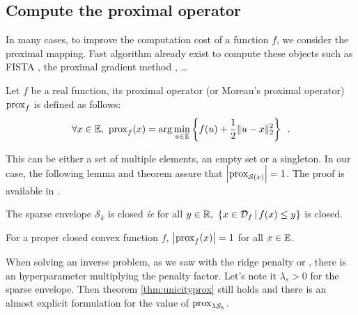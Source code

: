 
\subsection{Compute the proximal operator}

In many cases, to improve the computation cost of a function $f$, we consider the proximal mapping. Fast algorithm already exist to compute these objects such as FISTA \cite{beck2009fast}, the proximal gradient method \cite{ryu2017proximal}, \dots

\begin{definition}\label{def:prox}
Let $f$ be a real function, its proximal operator (or Moreau's proximal operator) $\operatorname{prox}_f$ is defined as follows:
\[\forall x\in\mathbb{E},\ \operatorname{prox}_f(x) =\arg\min_{u\in \mathbb{E}}\left\{f(u) + \frac{1}{2}\|u-x\|^2_2\right\}\enspace.\] 
\end{definition}

This can be either a set of multiple elements, an empty set or a singleton. In our case, the following lemma and theorem assure that $\left|\operatorname{prox}_{\mathcal{S}(x)}\right| = 1$. The proof is available in \cite{beck}.

\begin{lemma}
The sparse envelope $\mathcal{S}_k$ is closed \emph{ie} for all $y \in \RR,\ \left\{x\in \mathcal{D}_f\, |\, f(x)\leq y\right\}$ is closed.
\end{lemma}
\begin{theorem}\label{thm:unicityprox}
For a proper closed convex function $f$, $\left|\operatorname{prox}_f(x)\right| = 1$ for all $x\in\mathbb{E}$.
\end{theorem}

When solving an inverse problem, as we saw with the ridge penalty or \enet, there is an hyperparameter multiplying the penalty factor. Let's note it $\lambda_s>0$ for the sparse envelope. Then theorem  \ref{thm:unicityprox} still holds and there is an almost explicit formulation for the value of $\operatorname{prox}_{\lambda\mathcal{S}_k}$.

